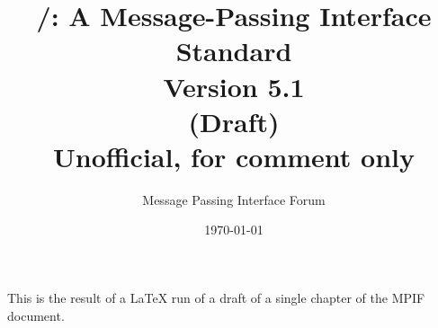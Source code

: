 \documentclass[twoside,11pt,fleqn,letterpaper,pagesize]{scrbook}
\begin{document}
\pagestyle{empty}

\title{\MPI/:  A Message-Passing Interface Standard
        \\ {\Large Version 5.1}
\ifdraft
        \\ {\large (Draft)}
        \\ {\large Unofficial, for comment only}
\fi
}

\author{Message Passing Interface Forum}

\date{\today}

\maketitle
\hfuzz=5pt

\newpage
\vspace{5.0in}
This is the result of a LaTeX run of a draft of a single chapter of
the MPIF document.
\newpage

\setcounter{page}{1}
\pagestyle{scrheadings}  %
\rehead{\upshape\textrm{\normalsize\thepage}}
\lohead{\upshape\textrm{\normalsize\thepage}}
\ifdraft
\cfoot{\drafttext}
\lofoot{}
\else
\cfoot{}
\fi

\startchap
\end{document}
